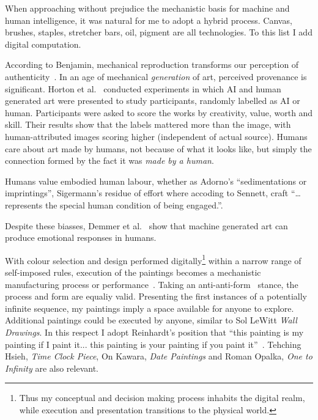 \documentclass[12pt]{article}
\begin{document}
When approaching without prejudice the mechanistic basis for machine
and human intelligence, it was natural for me to adopt a hybrid
process.  Canvas, brushes, staples, stretcher bars, oil, pigment are
all technologies. To this list I add digital computation.

According to Benjamin, mechanical reproduction transforms our
perception of authenticity~\cite{benjamin1969art}. In an age of
mechanical \emph{generation} of art, perceived provenance is
significant. Horton et al.~\cite{horton2023bias} conducted experiments
in which AI and human generated art were presented to study
participants, randomly labelled as AI or human. Participants were
asked to score the works by creativity, value, worth and skill. Their
results show that the labels mattered more than the image, with
human-attributed images scoring higher (independent of actual source).
Humans care about art made by humans, not because of what it looks
like, but simply the connection formed by the fact it was \emph{made
  by a human}.

Humans value embodied human labour, whether as Adorno's
``sedimentations or imprintings''\cite[p. 5]{adorno1970aesthetic},
Sigermann's residue of effort\cite[p. 77]{singerman1999artist} where
accoding to Sennett, craft ``\dots represents the special human
condition of being engaged.''\cite[p. 20]{sennett2008craftsman}.

Despite these biasses, Demmer et al.~\cite{demmer2023does} show
that machine generated art can produce emotional responses in humans.

With colour selection and design performed digitally\footnote{Thus my
  conceptual and decision making process inhabits the digital realm,
  while execution and presentation transitions to the physical world.}
within a narrow range of self-imposed rules, execution of the
paintings becomes a mechanistic manufacturing process or
performance~\cite[Sentence
\#28]{LeWitt1969Sentences}\cite{Jones1998BodyArt,LippardChandler1968Dematerialization,lippard1973sixyears}. Taking
an anti-anti-form~\cite{Morris1968AntiForm} stance, the process and
form are equaliy valid.  Presenting the first instances of a
potentially infinite sequence, my paintings imply a space available
for anyone to explore. Additional paintings could be executed by
anyone, similar to Sol LeWitt \emph{Wall Drawings}. In this respect I
adopt Reinhardt's position that ``this painting is my painting if I
paint it... this painting is your painting if you paint
it''~\cite{abstract-painting-1960}. Tehching Hsieh, \emph{Time Clock
  Piece}, On Kawara, \emph{Date Paintings} and Roman Opalka, \emph{One
  to Infinity} are also relevant.
\end{document}
